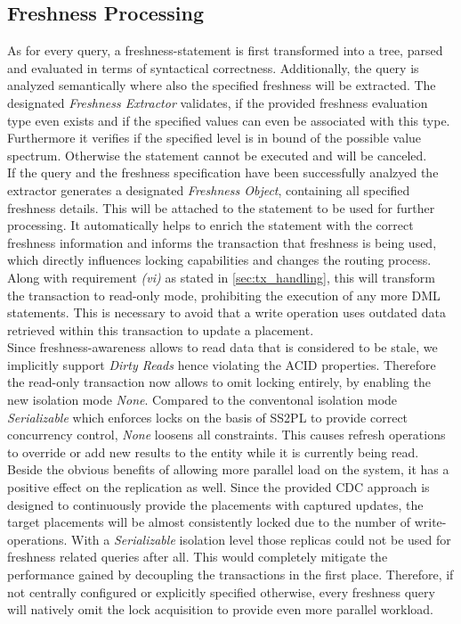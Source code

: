 
\subsection{Freshness Processing}
\label{sec:fresh_proc}

As for every query, a freshness-statement is first transformed into a tree, parsed and evaluated in terms of syntactical correctness. 
Additionally, the query is analyzed semantically where also the specified freshness will be extracted. The designated \textit{Freshness Extractor} 
validates, if the provided freshness evaluation type even exists and if the specified values can even be associated with this type.
Furthermore it verifies if the specified level is in bound of the possible value spectrum. 
Otherwise the statement cannot be executed and will be canceled.\\
If the query and the freshness specification have been successfully analzyed the extractor generates a designated \textit{Freshness Object}, 
containing all specified freshness details. This will be attached to the statement to be used for further processing.
It automatically helps to enrich the statement with the correct freshness information and informs the transaction that freshness is being used,
which directly influences locking capabilities and changes the routing process. 
Along with requirement \textit{(vi)} as stated in \ref{sec:tx_handling}, this will transform the transaction to read-only mode, prohibiting the execution of any more DML
statements. This is necessary to avoid that a write operation uses outdated data retrieved within this transaction to update a placement.\\

Since freshness-awareness allows to read data that is considered to be stale, we implicitly support \emph{Dirty Reads} hence violating the ACID properties.
Therefore the read-only transaction now allows to omit locking entirely, by enabling the new isolation mode \emph{None}. 
Compared to the conventonal isolation mode \emph{Serializable} which enforces locks on the basis of SS2PL to provide correct concurrency control, \emph{None} 
loosens all constraints. This causes refresh operations to override or add new results to the entity while it is currently being read. 
Beside the obvious benefits of allowing more parallel load on the system, it has a positive effect on the replication as well.
Since the provided CDC approach is designed to continuously provide the placements with captured updates, the target placements will be almost consistently locked due 
to the number of write-operations.
With a \emph{Serializable} isolation level those replicas could not be used for freshness related queries after all. 
This would completely mitigate the performance gained by decoupling the transactions in the first place. 
Therefore, if not centrally configured or explicitly specified otherwise, every freshness query will natively omit the lock acquisition to provide even more parallel workload.\\


